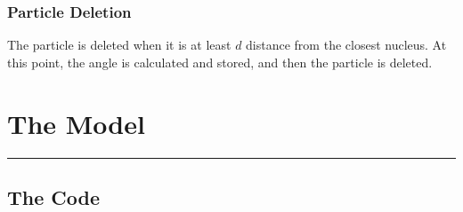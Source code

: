 \documentclass[11pt]{article}
\begin{document}
\hypertarget{particle-deletion}{%
\subsubsection{Particle Deletion}\label{particle-deletion}}

The particle is deleted when it is at least \(d\) distance from the
closest nucleus. At this point, the angle is calculated and stored, and
then the particle is deleted.

\pagebreak
    \hypertarget{the-model}{%
\section{The Model}\label{the-model}}

\begin{center}\rule{0.5\linewidth}{0.5pt}\end{center}

\hypertarget{the-code}{%
\subsection{The Code}\label{the-code}}
\end{document}
